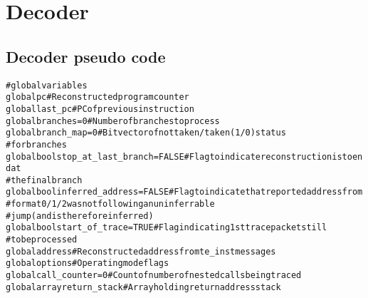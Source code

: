 \chapter{Decoder}

\section{Decoder pseudo code}

\begin{alltt}
# global variables
global       pc                          # Reconstructed program counter
global       last_pc                     # PC of previous instruction
global       branches = 0                # Number of branches to process
global       branch_map = 0              # Bit vector of not taken/taken (1/0) status
                                         #   for branches
global bool  stop_at_last_branch = FALSE # Flag to indicate reconstruction is to end at
                                         #   the final branch
global bool  inferred_address = FALSE    # Flag to indicate that reported address from
                                         #   format 0/1/2 was not following an uninferrable
                                         #   jump (and is therefore inferred)
global bool  start_of_trace = TRUE       # Flag indicating 1st trace packet still
                                         #   to be processed
global       address                     # Reconstructed address from te_inst messages
global       options                     # Operating mode flags
global       call_counter = 0            # Count of number of nested calls being traced
global array return_stack                # Array holding return address stack
\end{alltt}

\pagebreak

